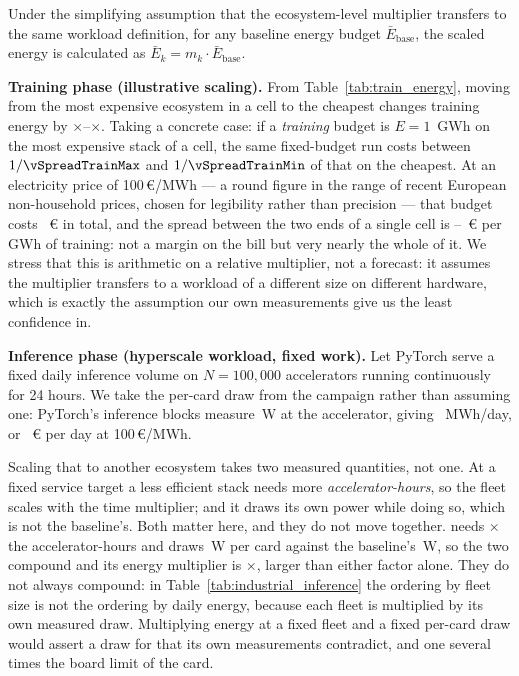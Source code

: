 Under the simplifying assumption that the ecosystem-level multiplier transfers to the same workload definition, for any baseline energy budget $\bar{E}_{\text{base}}$, the scaled energy is calculated as $\bar{E}_k = m_k \cdot \bar{E}_{\text{base}}$.

\textbf{Training phase (illustrative scaling).}
From Table~\ref{tab:train_energy}, moving from the most expensive ecosystem in a
cell to the cheapest changes training energy by
\vSpreadTrainMin$\times$--\vSpreadTrainMax$\times$. Taking a concrete case: if a
\emph{training} budget is $E=1$~GWh on the most expensive stack of a cell, the
same fixed-budget run costs between $1/\vSpreadTrainMax$ and
$1/\vSpreadTrainMin$ of that on the cheapest. At an electricity price of
100\,\euro/MWh --- a round figure in the range of recent
European non-household prices, chosen for legibility rather than precision ---
that budget costs \vTrainBudgetEur~\euro{} in total, and the spread between the
two ends of a single cell is
\vTrainBudgetSavingMinEur--\vTrainBudgetSavingMaxEur~\euro{} per GWh of
training: not a margin on the bill but very nearly the whole of it. We stress that this is arithmetic on a relative multiplier,
not a forecast: it assumes the multiplier transfers to a workload of a different
size on different hardware, which is exactly the assumption our own measurements
give us the least confidence in.

\textbf{Inference phase (hyperscale workload, fixed work).}
Let PyTorch serve a fixed daily inference volume on $N=100{,}000$ accelerators
running continuously for 24 hours. We take the per-card draw from the campaign
rather than assuming one: PyTorch's inference blocks measure
\vScenarioBaselineW\,\si{\watt} at the accelerator, giving
\vScenarioBaselineMWh~MWh/day, or \vScenarioBaselineCost~\euro{} per day at
100\,\euro/MWh.

Scaling that to another ecosystem takes two measured quantities, not one. At a fixed service target
a less efficient stack needs more \emph{accelerator-hours}, so the fleet scales
with the time multiplier; and it draws its own power while doing so, which is
not the baseline's. Both matter here, and they do not move together.
\vScenarioWorst{} needs \vScenarioWorstTimeMult$\times$ the
accelerator-hours and draws \vScenarioWorstW\,\si{\watt} per card against
the baseline's \vScenarioBaselineW\,\si{\watt}, so the two compound and its
energy multiplier is \vScenarioWorstMult$\times$, larger than either factor
alone. They do not always compound: in Table~\ref{tab:industrial_inference} the
ordering by fleet size is not the ordering by daily energy, because each fleet
is multiplied by its own measured draw.
Multiplying energy at a fixed fleet and a fixed per-card draw would assert a draw for \vScenarioWorst{} that its own measurements
contradict, and one several times the board limit of the card.

